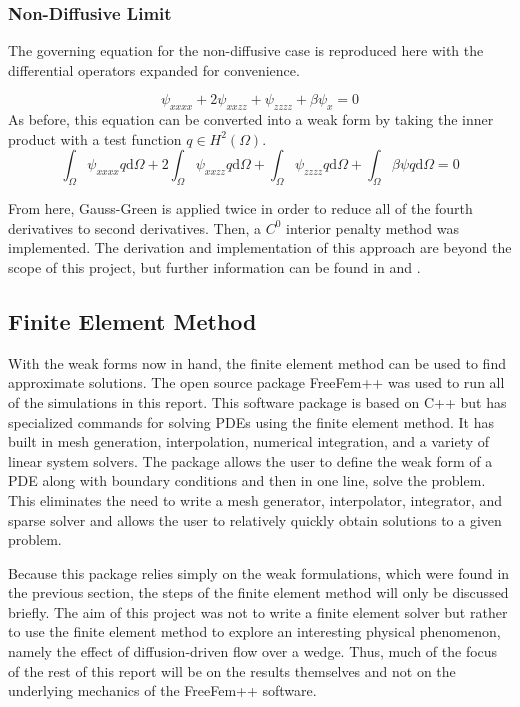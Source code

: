 \documentclass[12pt]{article}
\begin{document}
\subsubsection{Non-Diffusive Limit}

The governing equation for the non-diffusive case  is reproduced here with the differential operators expanded for convenience.

\begin{equation}
\psi_{xxxx}+2\psi_{xxzz}+\psi_{zzzz}+\beta\psi_x=0
\end{equation}
As before, this equation can be converted into a weak form by taking the inner product with a test function $q\in H^2(\Omega)$.
\begin{equation}
\int_\Omega\psi_{xxxx}q\text{d}\Omega+2\int_\Omega\psi_{xxzz}q\text{d}\Omega+\int_\Omega\psi_{zzzz}q\text{d}\Omega+\int_\Omega\beta\psi q\text{d}\Omega=0
\end{equation}

From here, Gauss-Green is applied twice in order to reduce all of the fourth derivatives to second derivatives. Then, a $C^0$ interior penalty method was implemented. The derivation and implementation of this approach are beyond the scope of this project, but further information can be found in \cite{KIM2016225} and \cite{ENGEL20023669}.

\subsection{Finite Element Method}

With the weak forms now in hand, the finite element method can be used to find approximate solutions. The open source package \textsf{FreeFem++} \cite{MR3043640} was used to run all of the simulations in this report. This software package is based on \textsf{C++} but has specialized commands for solving PDEs using the finite element method. It has built in mesh generation, interpolation, numerical integration, and a variety of linear system solvers. The package allows the user to define the weak form of a PDE along with boundary conditions and then in one line, solve the problem. This eliminates the need to write a mesh generator, interpolator, integrator, and sparse solver and allows the user to relatively quickly obtain solutions to a given problem.

Because this package relies simply on the weak formulations, which were found in the previous section, the steps of the finite element method will only be discussed briefly. The aim of this project was not to write a finite element solver but rather to use the finite element method to explore an interesting physical phenomenon, namely the effect of diffusion-driven flow over a wedge. Thus, much of the focus of the rest of this report will be on the results themselves and not on the underlying mechanics of the \textsf{FreeFem++} software.
\end{document}
